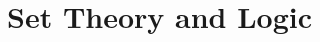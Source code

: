 \documentclass[../master.tex]{subfiles}
\begin{document}
\chapter{Set Theory and Logic}

\end{document}

